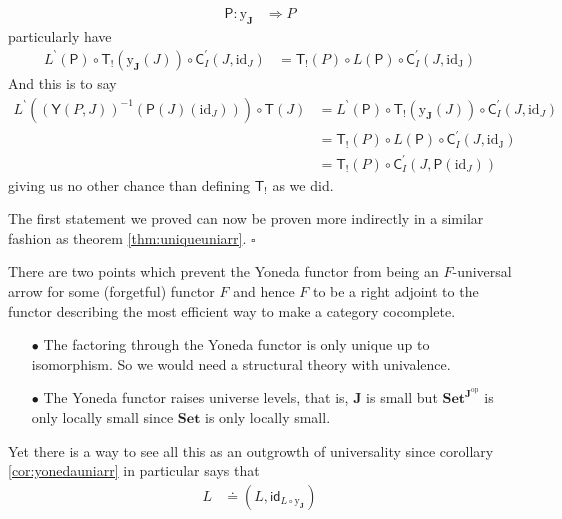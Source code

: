 \begin{prf}
\begin{description}
\begin{align*}
  \mathsf{P}
  \colon
  \mathrm{y}_{\mathbf{J}}
  &\Rightarrow
  P
\end{align*}
particularly have
\begin{align*}
  L^{\backprime}(\mathsf{P})
  \circ
  \mathsf{T}_{!}
  \left(
    \mathrm{y}_{\mathbf{J}}(J)
  \right)
  \circ
  \mathsf{C}_{I}^{\prime}(J,\mathrm{id}_{J})
  &=
  \mathsf{T}_{!}(P)
  \circ
  L(\mathsf{P})
  \circ
  \mathsf{C}_{I}^{\prime}(J,\mathrm{id_{J}})
\end{align*}
And this is to say
\begin{align*}
  L^{\backprime}
  \left(
    (\mathsf{Y}(P,J))^{-1}
    \left(
      \mathsf{P}(J)(\mathrm{id}_{J})
    \right)
  \right)
  \circ
  \mathsf{T}(J)
  \tag{NT}
  &=
  L^{\backprime}(\mathsf{P})
  \circ
  \mathsf{T}_{!}
  \left(
    \mathrm{y}_{\mathbf{J}}(J)
  \right)
  \circ
  \mathsf{C}_{I}^{\prime}(J,\mathrm{id}_{J})
  \\
  &=
  \mathsf{T}_{!}(P)
  \circ
  L(\mathsf{P})
  \circ
  \mathsf{C}_{I}^{\prime}(J,\mathrm{id_{J}})
  \\
  &=
  \mathsf{T}_{!}(P)
  \circ
  \mathsf{C}_{I}^{\prime}
  \left(
    J,
    \mathsf{P}(\mathrm{id}_{J})
  \right)
\end{align*}
giving us no other chance than defining $\mathsf{T}_{!}$ as we did.
\end{description}
The first statement we proved can now be proven more indirectly in a similar fashion as theorem \ref{thm:uniqueuniarr}.
\phantom{proven}
\hfill
$\square$
\end{prf}
There are two points which prevent the Yoneda functor from being an $F$-universal arrow for some (forgetful) functor $F$ and hence $F$ to be a right adjoint to the functor describing the most efficient way to make a category cocomplete.
\begin{enumerate}
\item[$\bullet$]
The factoring through the Yoneda functor is only unique up to isomorphism. So we would need a structural theory with univalence.
\item[$\bullet$]
The Yoneda functor raises universe levels, that is, $\mathbf{J}$ is small but $\mathbf{Set}^{\mathbf{J}^{\textrm{op}}}$ is only locally small since $\mathbf{Set}$ is only locally small.
\end{enumerate}
Yet there is a way to see all this as an outgrowth of universality since corollary \ref{cor:yonedauniarr} in particular says that
\begin{align*}
  L
  &\doteq
  \left(
    L,
    \mathsf{id}_{L \circ \mathrm{y}_{\mathbf{J}}}
  \right)
\end{align*}
